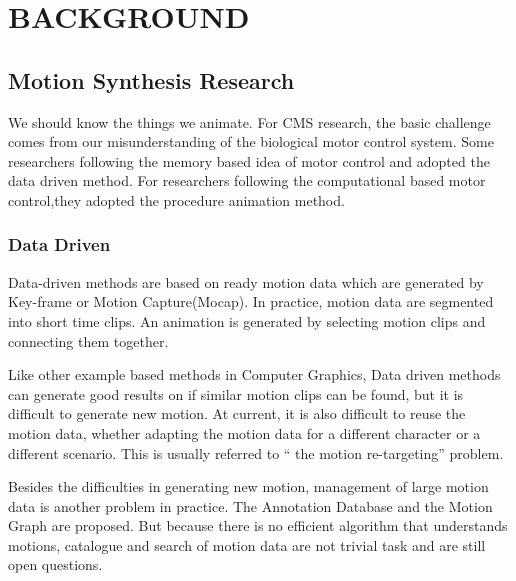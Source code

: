 ﻿\chapter{BACKGROUND}
\label{chap:background}
\section{Motion Synthesis Research}
We should know the things we animate. 
For CMS research, the basic challenge comes from our misunderstanding of the biological motor control system.
Some researchers following the memory based idea of motor control and adopted the data driven method.
For researchers following the computational based motor control,they adopted the procedure animation method.
\subsection{Data Driven}
Data-driven methods are based on ready motion data which are generated by Key-frame or Motion Capture(Mocap). 
In practice, motion data are segmented into short time clips. 
An animation is generated by selecting motion clips and connecting them together\citep{Parent2002}.

Like other example based methods in Computer Graphics, Data driven methods can generate good results on if similar motion clips can be found, but it is difficult to generate new motion.
At current, it is also difficult to reuse the motion data, whether adapting the motion data for a different character or a different scenario. 
This is usually referred to “ the motion re-targeting” problem.

Besides the difficulties in generating new motion, management of large motion data is another problem in practice. 
The Annotation Database \citep{Arikan2003} and the Motion Graph \citep{kovar2008motion}are proposed. 
But because there is no efficient algorithm that understands motions, catalogue and search of motion data are not trivial task and are still open questions.

